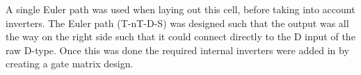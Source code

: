 
A single Euler path was used when laying out this cell, before taking into
account inverters. The Euler path (T-nT-D-S) was designed such that the output was all the
way on the right side such that it could connect directly to the D input of the
raw D-type. Once this was done the required internal inverters were added in by
creating a gate matrix design. 

